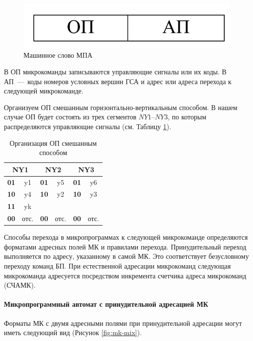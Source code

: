 \documentclass[a4paper,14pt]{extarticle}
\begin{document}
	\begin{figure}[h!]
		\centering
		\includegraphics[width=0.3\linewidth]{images/op}
		\caption{Машинное слово МПА	}
		\label{fig:op}
	\end{figure}

В ОП микрокоманды записываются управляющие сигналы или их коды. В АП~---~коды номеров условных вершин
ГСА и адрес или адреса перехода к следующей микрокоманде.

Организуем ОП смешанным горизонтально-вертикальным способом. В нашем случае ОП будет состоять из трех сегментов $NY1 – NY3$, по которым распределяются управляющие сигналы (см. Таблицу \ref{tab:op-mix}).

\begin{table}[h!]
	\centering
		\begin{tabular}{|c|c|c|c|c|c|}
		\hline
		\multicolumn{2}{|c|}{NY1} &  \multicolumn{2}{c|}{NY2} & \multicolumn{2}{c|}{NY3}  \\
		\hline
		\textbf{01} & y1 & \textbf{01} & y5 & \textbf{01} & y6 \\
		\hline
		\textbf{10} & y4 & \textbf{10} & y2 & \textbf{10} & y3 \\
		\hline
		\textbf{11} & yk & \textbf{} &  & \textbf{} &  \\
		\hline
		\textbf{00} & отс. & \textbf{00} & отс. & \textbf{00} & отс. \\
		\hline
	\end{tabular}
	\caption{Организация ОП смешанным способом}
	\label{tab:op-mix}
\end{table}


Способы перехода в микропрограммах к следующей микрокоманде определяются форматами адресных полей МК и правилами перехода. Принудительный переход выполняется по адресу, указанному в самой МК. Это соответствует безусловному переходу команд БП. При естественной адресации микрокоманд следующая микрокоманда адресуется посредством инкремента счетчика адреса микрокоманд (СЧАМК).

\paragraph{Микропрограммный автомат с принудительной адресацией МК}
Форматы МК с двумя адресными полями при принудительной адресации
могут иметь следующий вид (Рисунок \ref{fig:mk-mix}).
\end{document}
